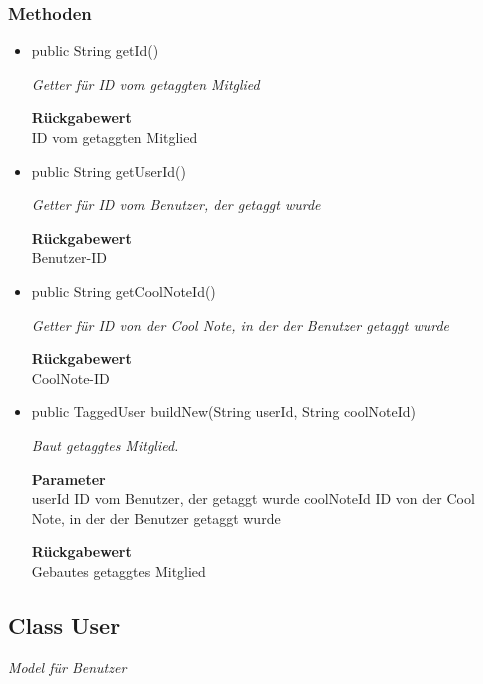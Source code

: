 \documentclass[a4paper]{scrreprt}
\begin{document}
        \subsubsection{Methoden}
        \begin{itemize}
        	\item{public String getId()}
        	
        	\textit{Getter für ID vom getaggten Mitglied}
        	
        	
        	
        	\textbf{Rückgabewert} \\
        	ID vom getaggten Mitglied        \item{public String getUserId()}
        	
        	\textit{Getter für ID vom Benutzer, der getaggt wurde}
        	
        	
        	
        	\textbf{Rückgabewert} \\
        	Benutzer-ID        \item{public String getCoolNoteId()}
        	
        	\textit{Getter für ID von der Cool Note, in der der Benutzer getaggt wurde}
        	
        	
        	
        	\textbf{Rückgabewert} \\
        	CoolNote-ID        \item{public TaggedUser buildNew(String userId, String coolNoteId)}
        	
        	\textit{Baut getaggtes Mitglied.}
        	
        	\textbf{Parameter} \\
        	userId ID vom Benutzer, der getaggt wurde
        	coolNoteId ID von der Cool Note, in der der Benutzer getaggt wurde
        	
        	\textbf{Rückgabewert} \\
        	Gebautes getaggtes Mitglied
        \end{itemize}
        \subsection{Class User}
        \textit{Model für Benutzer}
\end{document}
